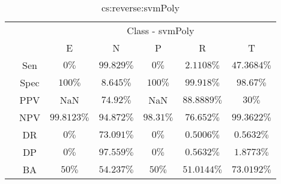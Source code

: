 \begin{table}[!ht]
	\centering
	\begin{tabular}{|c|c|c|c|c|c|c|}
		\cline{3-7}
		\multicolumn{2}{c|}{} & \multicolumn{5}{c|}{Class - svmPoly} \\ \cline{3-7}
		\multicolumn{2}{c|}{} & E & N & P & R & T \\ \hline
		\multirow{7}{*}{\rotatebox{90}{Statistics}} & Sen & $0\%$ & $99.829\%$ & $0\%$ & $2.1108\%$ & $47.3684\%$ \\ \cline{2-7}
		 & Spec & $100\%$ & $8.645\%$ & $100\%$ & $99.918\%$ & $98.67\%$ \\ \cline{2-7}
		 & PPV & NaN & $74.92\%$ & NaN & $88.8889\%$ & $30\%$ \\ \cline{2-7}
		 & NPV & $99.8123\%$ & $94.872\%$ & $98.31\%$ & $76.652\%$ & $99.3622\%$ \\ \cline{2-7}
		 & DR & $0\%$ & $73.091\%$ & $0\%$ & $0.5006\%$ & $0.5632\%$ \\ \cline{2-7}
		 & DP & $0\%$ & $97.559\%$ & $0\%$ & $0.5632\%$ & $1.8773\%$ \\ \cline{2-7}
		 & BA & $50\%$ & $54.237\%$ & $50\%$ & $51.0144\%$ & $73.0192\%$ \\ \hline
	\end{tabular}
	\caption{cs:reverse:svmPoly}
	\label{tab:cs:reverse:svmPoly}
\end{table}

